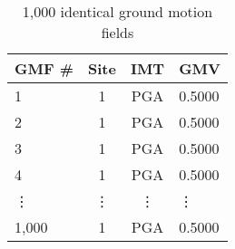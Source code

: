 \begin{table}[htbp]

\centering
\begin{tabular}{ l c c l }

\hline
\rowcolor{anti-flashwhite}
\bf{GMF \#} & \bf{Site} & \bf{IMT} & \bf{GMV}\\
\hline
1 & 1 & PGA & 0.5000 \\
2 & 1 & PGA & 0.5000 \\
3 & 1 & PGA & 0.5000 \\
4 & 1 & PGA & 0.5000 \\
\vdots & \vdots & \vdots & \vdots \\
1,000 & 1 & PGA & 0.5000 \\
\hline
\end{tabular}

\caption{1,000 identical ground motion fields}
\label{tab:scenario-gmfs-identical-1000}
\end{table}